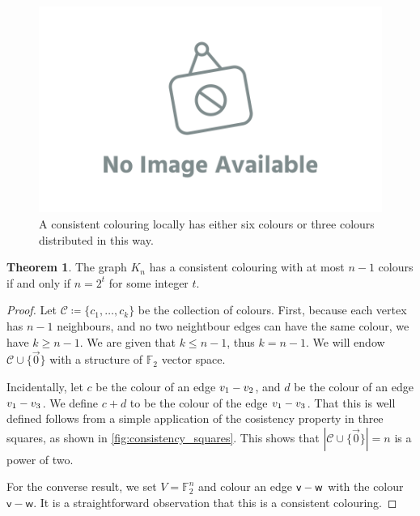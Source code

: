 \documentclass[12pt]{amsart}
\theoremstyle{definition}
\newtheorem{thm}{Theorem}[section]
\newcommand{\F}{\mathbb{F}}
\newcommand{\CC}{\mathcal C}
\newcommand{\vv}{\mathsf{v}}
\newcommand{\vw}{\mathsf{w}}
\begin{document}
\begin{figure}[h]
\includegraphics[scale=.1]{../imgs/ina.png}%
\caption{A consistent colouring locally has either six colours or three colours distributed in this way.\label{fig:consistent_colouring}}
\end{figure}


\begin{thm}
The graph $K_n$ has a consistent colouring with at most $n-1$ colours if and only if $n = 2^t $ for some integer $t$.
\end{thm}

\begin{proof}
Let $\CC \coloneqq\{ c_1, \dots, c_k\}$ be the collection of colours.
First, because each vertex has $n-1$ neighbours, and no two neightbour edges can have the same colour, we have $k \geq n-1$.
We are given that $k \leq n-1$, thus $k = n-1$. 
We will endow $\CC \cup \{\vec{0}\}$ with a structure of $\F_2$ vector space.

Incidentally, let $c$ be the colour of an edge $v_1 \-- v_2$, and $d$ be the colour of an edge $v_1 \-- v_3$.
We define $c + d $ to be the colour of the edge $v_1 \-- v_3$.
That this is well defined follows from a simple application of the cosistency property in three squares, as shown in \cref{fig:consistency_squares}.
This shows that $|\CC \cup \{\vec{0}\}| = n$ is a power of two.

For the converse result, we set $V = \F_2^n$ and colour an edge $\vv \-- \vw$ with the colour $\vv - \vw$.
It is a straightforward observation that this is a consistent colouring.
\end{proof}
\end{document}
